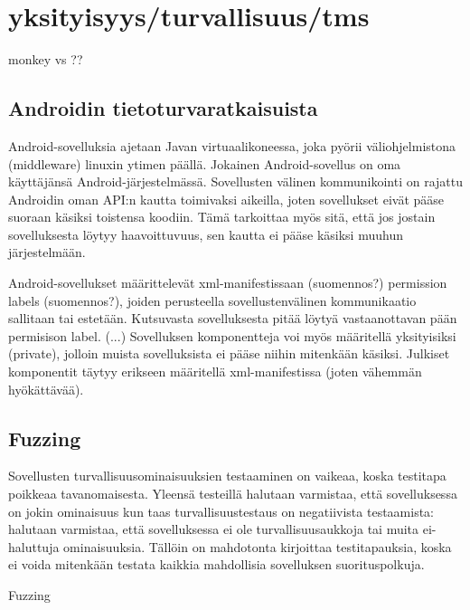\section{yksityisyys/turvallisuus/tms}

monkey vs ??

\subsection{Androidin tietoturvaratkaisuista}

Android-sovelluksia ajetaan Javan virtuaalikoneessa, joka pyörii väliohjelmistona (middleware) linuxin ytimen päällä. Jokainen Android-sovellus on oma käyttäjänsä Android-järjestelmässä. Sovellusten välinen kommunikointi on rajattu Androidin oman API:n kautta toimivaksi aikeilla, joten sovellukset eivät pääse suoraan käsiksi toistensa koodiin. Tämä tarkoittaa myös sitä, että jos jostain sovelluksesta löytyy haavoittuvuus, sen kautta ei pääse käsiksi muuhun järjestelmään.

Android-sovellukset määrittelevät xml-manifestissaan (suomennos?) permission labels (suomennos?), joiden perusteella sovellustenvälinen kommunikaatio sallitaan tai estetään. Kutsuvasta sovelluksesta pitää löytyä vastaanottavan pään permisison label. (...) Sovelluksen komponentteja voi myös määritellä yksityisiksi (private), jolloin muista sovelluksista ei pääse niihin mitenkään käsiksi. Julkiset komponentit täytyy erikseen määritellä xml-manifestissa (joten vähemmän hyökättävää).

\cite{android_security}

\subsection{Fuzzing}

Sovellusten turvallisuusominaisuuksien testaaminen on vaikeaa, koska testitapa poikkeaa tavanomaisesta. Yleensä testeillä halutaan varmistaa, että sovelluksessa on jokin ominaisuus kun taas turvallisuustestaus on negatiivista testaamista: halutaan varmistaa, että sovelluksessa ei ole turvallisuusaukkoja tai muita ei-haluttuja ominaisuuksia. Tällöin on mahdotonta kirjoittaa testitapauksia, koska ei voida mitenkään testata kaikkia mahdollisia sovelluksen suorituspolkuja.\cite{mahmoodetal12}

Fuzzing 
